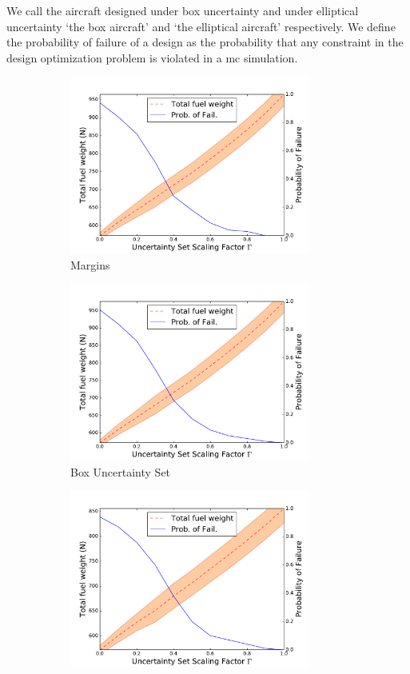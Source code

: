 We call the aircraft designed under box uncertainty and under elliptical uncertainty `the box aircraft'
and `the elliptical aircraft' respectively. We
define the probability of failure of a design as the probability that any constraint
in the design optimization problem is violated in a \gls{mc} simulation.

\begin{figure}[ht]
    \centering
    \captionsetup{justification=centering, font=small}
    \begin{subfigure}{0.49\textwidth}
        \centering
        \includegraphics[height=2.3in]{signomial_simple_flight/margins.pdf}
         \caption{Margins}
    \end{subfigure}%
    \begin{subfigure}{0.49\textwidth}
        \centering
        \includegraphics[height=2.3in]{signomial_simple_flight/box_best_pairs.pdf}
         \caption{Box Uncertainty Set}
    \end{subfigure}%
    \bigskip
    \begin{subfigure}{0.49\textwidth}
        \centering
        \includegraphics[height=2.3in]{signomial_simple_flight/ell_best_pairs.pdf}

\end{subfigure}
\end{figure}
